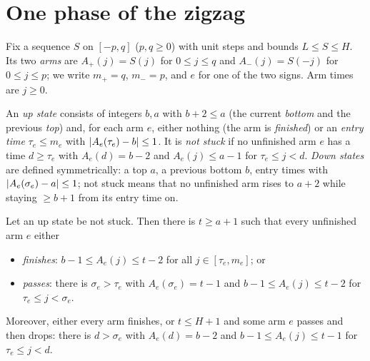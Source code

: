 \section{One phase of the zigzag}\label{sec:fold-phase}

Fix a sequence $S$ on $[-p,q]$ ($p,q\ge0$) with unit steps and bounds $L\le S\le H$. Its two \emph{arms} are $A_+(j)=S(j)$ for
$0\le j\le q$ and $A_-(j)=S(-j)$ for $0\le j\le p$; we write $m_+=q$, $m_-=p$, and $e$ for one of the two signs. Arm times
are $j\ge0$.

\begin{definition}\label{def:phase-state}
An \emph{up state} consists of integers $b,a$ with $b+2\le a$ (the current \emph{bottom} and the previous \emph{top}) and, for
each arm $e$, either nothing (the arm is \emph{finished}) or an \emph{entry time} $\tau_e\le m_e$ with $\left\lvert A_e(\tau_e)-b\right\rvert\le1$.
It is \emph{not stuck} if no unfinished arm $e$ has a time $d\ge\tau_e$ with $A_e(d)=b-2$ and $A_e(j)\le a-1$ for $\tau_e\le
j<d$. \emph{Down states} are defined symmetrically: a top $a$, a previous bottom $b$, entry times with $\left\lvert A_e(\sigma_e)-a\right\rvert\le1$;
not stuck means that no unfinished arm rises to $a+2$ while staying $\ge b+1$ from its entry time on.
\end{definition}

\begin{lemma}[Up phase]\label{lem:up-phase}
Let an up state be not stuck. Then there is $t\ge a+1$ such that every unfinished arm $e$ either
\begin{itemize}
\item \emph{finishes}: $b-1\le A_e(j)\le t-2$ for all $j\in[\tau_e,m_e]$; or
\item \emph{passes}: there is $\sigma_e>\tau_e$ with $A_e(\sigma_e)=t-1$ and $b-1\le A_e(j)\le t-2$ for $\tau_e\le j<\sigma_e$.
\end{itemize}
Moreover, either every arm finishes, or $t\le H+1$ and some arm $e$ passes and then drops: there is $d>\sigma_e$ with $A_e(d)=b-2$
and $b-1\le A_e(j)\le t-1$ for $\tau_e\le j<d$.
\end{lemma}

